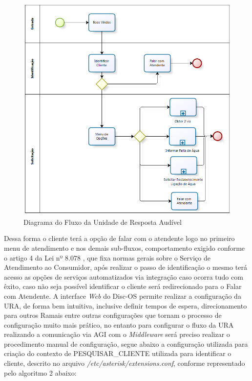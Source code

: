 \begin{figure}[!htb]
	\centering
	\caption{Diagrama do Fluxo da Unidade de Resposta Audível}
	\label{figura:fluxoURA}	
	\includegraphics{figuras/fluxo_ura.png}
\end{figure}


Dessa forma o cliente terá a opção de falar com o atendente logo no primeiro menu de atendimento e nos demais sub-fluxos, comportamento exigido conforme o artigo 4 da Lei nº 8.078 \cite{leiAtendimentoAoConsumidor}, que fixa normas gerais sobre o Serviço de Atendimento ao Consumidor, após realizar o passo de identificação o mesmo terá acesso as opções de serviços automatizados via integração caso ocorra tudo com êxito, caso não seja possível identificar o cliente será redirecionado para o Falar com Atendente.
A interface \textit{Web} do Disc-OS permite realizar a configuração da URA, de forma bem intuitiva, inclusive definir tempos de espera, direcionamento para outros Ramais entre outras configurações que tornam o processo de configuração muito mais prático, no entanto para configurar o fluxo da URA realizando a comunicação via AGI com o \textit{Middleware} será preciso realizar o procedimento manual de configuração, segue abaixo a configuração utilizada para criação do contexto de PESQUISAR\_CLIENTE utilizada para identificar o cliente, descrito no arquivo \textit{/etc/asterisk/extensions.conf}, conforme representado pelo algoritmo 2 abaixo:


